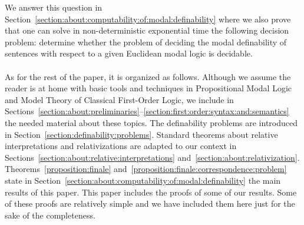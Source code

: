 \documentclass[draft]{article}
\begin{document}
We answer this question in Section~\ref{section:about:computability:of:modal:definability} where we
also prove that one can solve in non-deterministic exponential time the following decision problem: determine whether the problem of deciding the modal definability of sentences with respect to a given Euclidean modal logic is decidable.
%
%
\\
\\
%
%
As for the rest of the paper, it is organized as follows.
Although we assume the reader is at home with basic tools and techniques in Propositional Modal Logic and Model Theory of Classical First-Order Logic, we include in Sections~\ref{section:about:preliminaries}--\ref{section:first:order:syntax:and:semantics} the needed material about these topics.
The definability problems are introduced in Section~\ref{section:definability:problems}.
Standard theorems about relative interpretations and relativizations are adapted to our context in Sections~\ref{section:about:relative:interpretations} and~\ref{section:about:relativization}.
Theorems~\ref{proposition:finale} and~\ref{proposition:finale:correspondence:problem} state in Section~\ref{section:about:computability:of:modal:definability} the main results of this paper.
This paper includes the proofs of some of our results.
Some of these proofs are relatively simple and we have included them here just for the sake of the completeness.
%
%
%
%
\end{document}
